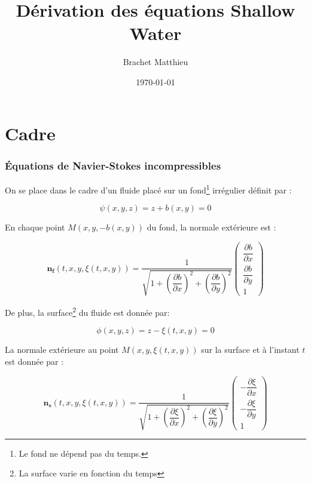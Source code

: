 \documentclass[10pt,a4paper]{amsart}
\author{Brachet Matthieu}
\title{Dérivation des équations Shallow Water}
\date\today
\begin{document}
\maketitle

\tableofcontents


\part{Cadre}

\section{\'Equations de Navier-Stokes incompressibles}

On se place dans le cadre d'un fluide placé sur un fond\footnote{Le fond ne dépend pas du temps.} irrégulier définit par :

\begin{equation}\label{Fond}
\psi(x,y,z) = z+b(x,y) = 0
\end{equation}

En chaque point $M(x,y,-b(x,y))$ du fond, la normale extérieure est :

\begin{equation}
\mathbf{n_f}(t,x,y,\xi(t,x,y)) = \dfrac{1}{\sqrt{1+\left( \dfrac{\partial b}{\partial x} \right)^2+\left( \dfrac{\partial b}{\partial y} \right)^2}} \begin{pmatrix}
\dfrac{\partial b}{\partial x} \\ 
\dfrac{\partial b}{\partial y} \\ 
1
\end{pmatrix} 
\end{equation}

De plus, la surface\footnote{La surface varie en fonction du temps} du fluide est donnée par:

\begin{equation}\label{Surface}
\phi(x,y,z) = z-\xi(t,x,y) = 0
\end{equation}

La normale extérieure au point $M(x,y,\xi(t,x,y))$ sur la surface et à l'instant $t$ est donnée par :

\begin{equation}
\mathbf{n_s}(t,x,y,\xi(t,x,y)) = \dfrac{1}{\sqrt{1+\left( \dfrac{\partial \xi}{\partial x} \right)^2+\left( \dfrac{\partial \xi}{\partial y} \right)^2}} \begin{pmatrix}
-\dfrac{\partial \xi}{\partial x} \\ 
-\dfrac{\partial \xi}{\partial y} \\ 
1
\end{pmatrix} 
\end{equation}
\end{document}
